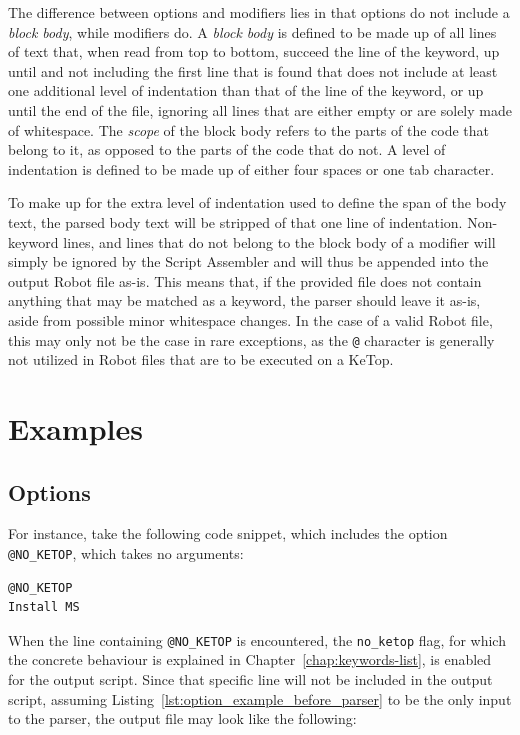 The difference between options and modifiers lies in that options do not include a \textit{block body}, while modifiers do. A \textit{block body} is defined to be made up of all lines of text that, when read from top to bottom, succeed the line of the keyword, up until and not including the first line that is found that does not include at least one additional level of indentation than that of the line of the keyword, or up until the end of the file, ignoring all lines that are either empty or are solely made of whitespace. The \textit{scope} of the block body refers to the parts of the code that belong to it, as opposed to the parts of the code that do not. A level of indentation is defined to be made up of either four spaces or one tab character. 

To make up for the extra level of indentation used to define the span of the body text, the parsed body text will be stripped of that one line of indentation. Non-keyword lines, and lines that do not belong to the block body of a modifier will simply be ignored by the Script Assembler and will thus be appended into the output Robot file as-is. This means that, if the provided file does not contain anything that may be matched as a keyword, the parser should leave it as-is, aside from possible minor whitespace changes. In the case of a valid Robot file, this may only not be the case in rare exceptions, as the \verb|@| character is generally not utilized in Robot files that are to be executed on a KeTop.

\section{Examples}

\subsection{Options}

For instance, take the following code snippet, which includes the option \verb|@NO_KETOP|, which takes no arguments:

\begin{lstlisting}[caption=Example of an Option before parsing., label={lst:option_example_before_parser}]
@NO_KETOP
Install MS
\end{lstlisting}

When the line containing \verb|@NO_KETOP| is encountered, the \verb|no_ketop| flag, for which the concrete behaviour is explained in Chapter~\ref{chap:keywords-list}, is enabled for the output script. Since that specific line will not be included in the output script, assuming Listing~\ref{lst:option_example_before_parser} to be the only input to the parser, the output file may look like the following:

